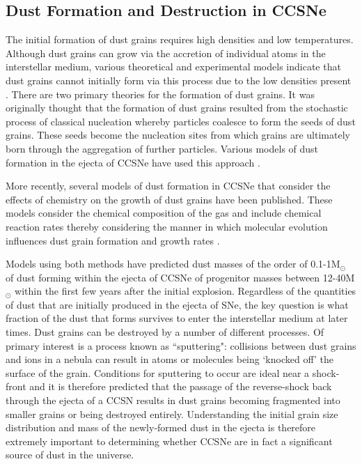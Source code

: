 \subsection{Dust Formation and Destruction in CCSNe}
\label{scn:dust_formation}

The initial formation of dust grains requires high densities and low temperatures.  Although dust grains can grow via the accretion of individual atoms in the interstellar medium, various theoretical and experimental models indicate that dust grains cannot initially form via this process due to the low densities present \citep{Osterbrock2006}.  There are two primary theories for the formation of dust grains.  It was originally thought that the formation of dust grains resulted from the stochastic process of classical nucleation whereby particles coalesce to form the seeds of dust grains.  These seeds become the nucleation sites from which grains are ultimately born through the aggregation of further particles.  Various models of dust formation in the ejecta of CCSNe have used this approach \citep{Kozasa1989, Todini2001,Nozawa2003, Schneider2004}.  

More recently, several models of dust formation in CCSNe that consider the effects of chemistry on the growth of dust grains have been published.   These models consider the chemical composition of the gas and include chemical reaction rates thereby considering the manner in which molecular evolution influences dust grain formation and growth rates \citep{Cherchneff2009, Cherchneff2010, Sarangi2013, Sarangi2015}.

Models using both methods have predicted dust masses of the order of 0.1-1M$_{\odot}$ of dust forming within the ejecta of CCSNe of progenitor masses between 12-40M$_{\odot}$ within the first few years after the initial explosion.  Regardless of the quantities of dust that are initially produced in the ejecta of SNe, the key question is what fraction of the dust that forms survives to enter the interstellar medium at later times. Dust grains can be destroyed by a number of different processes.  Of primary interest is a process known as ``sputtering": collisions between dust grains and ions in a nebula can result in atoms or molecules being `knocked off' the surface of the grain.  Conditions for sputtering to occur are ideal near a shock-front \citep{Barlow1977} and it is therefore predicted that the passage of the reverse-shock back through the ejecta of a CCSN results in dust grains becoming fragmented into smaller grains or being destroyed entirely.  Understanding the initial grain size distribution and mass of the newly-formed dust in the ejecta is therefore extremely important to determining whether CCSNe are in fact a significant source of dust in the universe.

